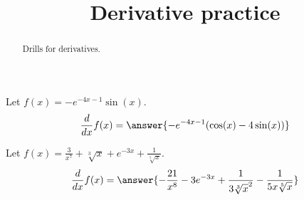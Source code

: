 \documentclass{ximera}
\title[Reinforce:]{Derivative practice}
\begin{document}
\begin{abstract}
  Drills for derivatives.
\end{abstract}
\maketitle


\begin{shuffle}
\begin{exercise}
Let $f(x)=-e^{-4 x-1} \sin (x)$.
\[
\ddx f(x) = \answer{-e^{-4 x-1} (\cos (x)-4 \sin (x))}
\]
\end{exercise}

\begin{exercise}
Let $f(x)=\frac{3}{x^7}+\sqrt[3]{x}+e^{-3 x}+\frac{1}{\sqrt[5]{x}}$.
\[
\ddx f(x) = \answer{-\frac{21}{x^8}-3 e^{-3 x}+\frac{1}{3 \sqrt[3]{x}^2}-\frac{1}{5 x \sqrt[5]{x}}}
\]
\end{exercise}

\end{shuffle}
\end{document}

